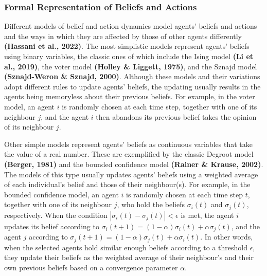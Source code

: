 \documentclass[
  11pt,
]{article}
\begin{document}
\hypertarget{formal-representation-of-beliefs-and-actions}{%
\subsubsection{Formal Representation of Beliefs and
Actions}\label{formal-representation-of-beliefs-and-actions}}

Different models of belief and action dynamics model agents' beliefs and
actions and the ways in which they are affected by those of other agents
differently \textbf{(Hassani et al., 2022)}. The most simplistic models
represent agents' beliefs using binary variables, the classic ones of
which include the Ising model \textbf{(Li et al., 2019)}, the voter
model \textbf{(Holley \& Liggett, 1975)}, and the Sznajd model
\textbf{(Sznajd-Weron \& Sznajd, 2000)}. Although these models and their
variations adopt different rules to update agents' beliefs, the updating
usually results in the agents being memoryless about their previous
beliefs. For example, in the voter model, an agent \(i\) is randomly
chosen at each time step, together with one of its neighbour \(j\), and
the agent \(i\) then abandons its previous belief takes the opinion of
its neighbour \(j\).

Other simple models represent agents' beliefs as continuous variables
that take the value of a real number. These are exemplified by the
classic Degroot model \textbf{(Berger, 1981)} and the bounded confidence
model \textbf{(Rainer \& Krause, 2002)}. The models of this type usually
updates agents' beliefs using a weighted average of each individual's
belief and those of their neighbour(s). For example, in the bounded
confidence model, an agent \(i\) is randomly chosen at each time step
\(t\), together with one of its neighbour \(j\), who hold the beliefs
\(\sigma_i(t)\) and \(\sigma_j(t)\), respectively. When the condition
\(|\sigma_i(t) - \sigma_j(t)| < \epsilon\) is met, the agent \(i\)
updates its belief according to
\(\sigma_i(t+1) = (1 - \alpha)\sigma_i(t) + \alpha\sigma_j(t)\), and the
agent \(j\) according to
\(\sigma_j(t+1) = (1 - \alpha)\sigma_j(t) + \alpha\sigma_i(t)\). In
other words, when the selected agents hold similar enough beliefs
according to a threshold \(\epsilon\), they update their beliefs as the
weighted average of their neighbour's and their own previous beliefs
based on a convergence parameter \(\alpha\).
\end{document}
